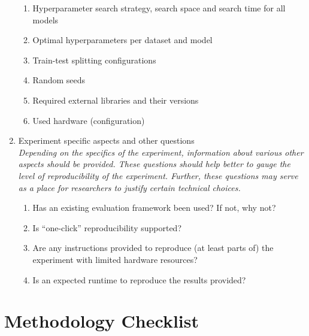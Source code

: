 \documentclass{article}
\begin{document}
\begin{enumerate}
    \begin{enumerate}[label*=\arabic*.]
        \item Hyperparameter search strategy, search space and search time for all models
        \item Optimal hyperparameters per dataset and model
        \item Train-test splitting configurations
        \item Random seeds
        \item Required external libraries and their versions
        \item Used hardware (configuration)
    \end{enumerate}
\item Experiment specific aspects and other questions \\ 
\emph{Depending on the specifics of the experiment, information about various other aspects should be provided. These questions should help better to gauge the level of reproducibility of the experiment. Further, these questions may serve as a place for researchers to justify certain technical choices. }
    \begin{enumerate}[label*=\arabic*.]
        \item Has an existing evaluation framework been used? If not, why not?
        \item Is ``one-click'' reproducibility supported?
        \item Are any instructions provided to reproduce (at least parts of) the experiment with limited hardware resources?
        \item Is an expected runtime to reproduce the results provided?
    \end{enumerate}
\end{enumerate}

\section{Methodology Checklist}
\end{document}
